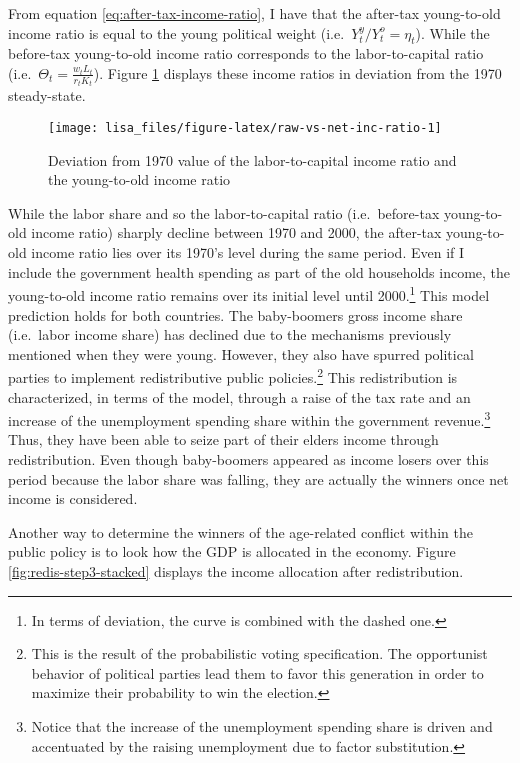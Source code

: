 \documentclass[
]{article}
\begin{document}
From equation \eqref{eq:after-tax-income-ratio}, I have that the after-tax young-to-old income ratio is equal to the young political weight (i.e.~\(Y_t^y/Y_t^o = \eta_t\)). While the before-tax young-to-old income ratio corresponds to the labor-to-capital ratio (i.e.~\(\Theta_t = \frac{w_tL_t}{r_tK_t}\)). Figure \ref{fig:raw-vs-net-inc-ratio} displays these income ratios in deviation from the 1970 steady-state.

\begin{figure}[!tb]

{\centering \texttt{[image: lisa\_files/figure-latex/raw-vs-net-inc-ratio-1]} 

}

\caption{Deviation from 1970 value of the labor-to-capital income ratio and the young-to-old income ratio}\label{fig:raw-vs-net-inc-ratio}
\end{figure}

While the labor share and so the labor-to-capital ratio (i.e.~before-tax young-to-old income ratio) sharply decline between 1970 and 2000, the after-tax young-to-old income ratio lies over its 1970's level during the same period. Even if I include the government health spending as part of the old households income, the young-to-old income ratio remains over its initial level until 2000.\footnote{In terms of deviation, the curve is combined with the dashed one.} This model prediction holds for both countries. The baby-boomers gross income share (i.e.~labor income share) has declined due to the mechanisms previously mentioned when they were young. However, they also have spurred political parties to implement redistributive public policies.\footnote{This is the result of the probabilistic voting specification. The opportunist behavior of political parties lead them to favor this generation in order to maximize their probability to win the election.} This redistribution is characterized, in terms of the model, through a raise of the tax rate and an increase of the unemployment spending share within the government revenue.\footnote{Notice that the increase of the unemployment spending share is driven and accentuated by the raising unemployment due to factor substitution.} Thus, they have been able to seize part of their elders income through redistribution. Even though baby-boomers appeared as income losers over this period because the labor share was falling, they are actually the winners once net income is considered.

Another way to determine the winners of the age-related conflict within the public policy is to look how the GDP is allocated in the economy. Figure \ref{fig:redis-step3-stacked} displays the income allocation after redistribution.
\end{document}
